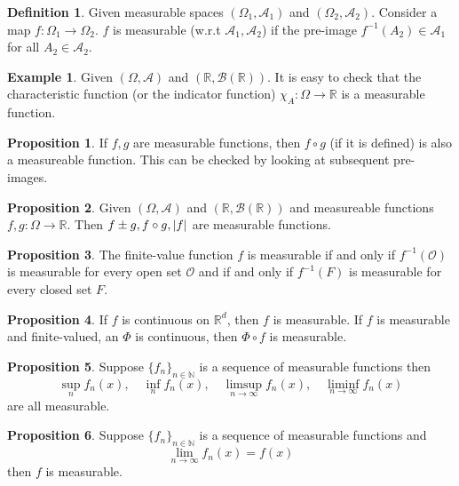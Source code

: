 \documentclass{article}
\theoremstyle{definition}
\newtheorem{prop}{Proposition}[section]
\newtheorem{exmp}{Example}[section]
\newcommand{\R}{\mathbb{R}}
\theoremstyle{theorem}
\newtheorem{definition}[theorem]{Definition}
\begin{document}
\begin{definition}
Given measurable spaces $(\Omega_1, \mathcal{A}_1)$ and $(\Omega_2, \mathcal{A}_2)$. Consider a map $f : \Omega_1 \to \Omega_2$. $f$ is measurable (w.r.t $\mathcal{A}_1, \mathcal{A}_2$) if the pre-image $f^{-1}(A_2) \in \mathcal{A}_1$ for all $A_2 \in \mathcal{A}_2$. 
\end{definition}


\begin{exmp}
Given $(\Omega, \mathcal{A})$ and $(\mathbb{R}, \mathcal{B}(\mathbb{R}))$. It is easy to check that the characteristic function (or the indicator function) $\chi_A : \Omega \to \mathbb{R}$ is a measurable function. 
\end{exmp}


\begin{prop}
If $f,g$ are measurable functions, then $f\circ g$ (if it is defined) is also a measureable function. This can be checked by looking at subsequent pre-images. 
\end{prop}


\begin{prop}
Given $(\Omega, \mathcal{A})$ and $(\mathbb{R}, \mathcal{B}(\mathbb{R}))$ and measureable functions $f,g : \Omega \to \mathbb{R}$. Then $f\pm g, f\circ g, \abs{f}$ are measurable functions. 
\end{prop}




\begin{prop}
The finite-value function $f$ is measurable if and only if $f^{-1}(\mathcal{O})$ is measurable for every open set $\mathcal{O}$ and if and only if $f^{-1}(F) $ is measurable for every closed set $F$. 
\end{prop}


\begin{prop}
If $f$ is continuous on $\R^d$, then $f$ is measurable. If $f$ is measurable and finite-valued, an $\Phi$ is continuous, then $\Phi \circ f$ is measurable. 
\end{prop}


\begin{prop}
Suppose $\{ f_n \}_{n\in \mathbb{N}}$ is a sequence of measurable functions then 
\begin{equation*}
    \sup_n f_n(x), \quad \inf_n f_n(x), \quad  \limsup_{n\to \infty} f_n(x), \quad \liminf_{n\to \infty} f_n(x)
\end{equation*}
are all measurable. 
\end{prop}


\begin{prop}
Suppose $\{ f_n \}_{n\in \mathbb{N}}$ is a sequence of measurable functions and 
\begin{equation*}
    \lim_{n\to \infty} f_n(x) = f(x)
\end{equation*}
then $f$ is measurable. 
\end{prop}
\end{document}
